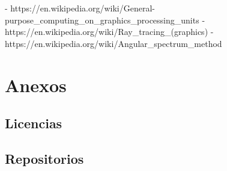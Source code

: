\documentclass[10pt, a4paper]{article}
\begin{document}
- https://en.wikipedia.org/wiki/General-purpose_computing_on_graphics_processing_units
- https://en.wikipedia.org/wiki/Ray_tracing_(graphics)
- https://en.wikipedia.org/wiki/Angular_spectrum_method

\printbibliography[heading=bibintoc]

\section{Anexos}

\subsection{Licencias}

\subsection{Repositorios}
\end{document}
